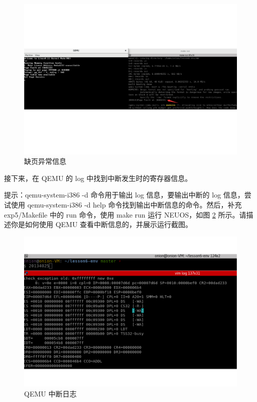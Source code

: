 \begin{figure}[htbp]
    \centering
    \includegraphics[width=\textwidth]{img/缺页异常信息.pdf}
    \caption{缺页异常信息}
    \label{fig:缺页异常信息}
\end{figure}

接下来，在 QEMU 的 log 中找到中断发生时的寄存器信息。

提示：qemu-system-i386 -d 命令用于输出 log 信息，要输出中断的 log 信息，尝试使用 qemu-system-i386 -d help 命令找到输出中断信息的命令。然后，补充 exp5/Makefile 中的 run 命令，使用 make run 运行 NEUOS，如图 \ref{fig:QEMU中断日志} 所示。请描述你是如何使用 QEMU 查看中断信息的，并展示运行截图。

\begin{figure}[htbp]
    \centering
    \includegraphics[width=\textwidth]{img/QEMU中断日志.pdf}
    \caption{QEMU 中断日志}
    \label{fig:QEMU中断日志}
\end{figure}

